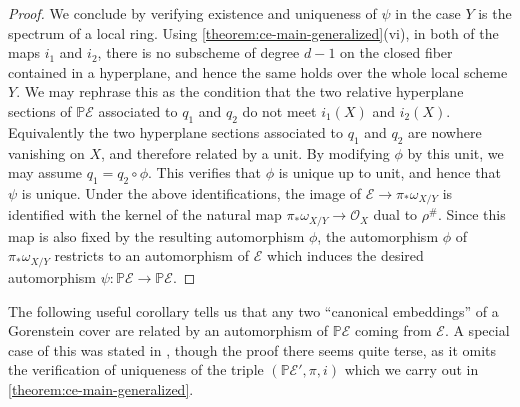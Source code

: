 \documentclass[12 pt]{amsart}
\theoremstyle{plain}
\theoremstyle{definition}
\theoremstyle{remark}
\numberwithin{equation}{section}
\newcommand\bp{\mathbb P}
\newcommand\sce{\mathscr E}
\newcommand\sco{\mathscr O}
\begin{document}
\begin{proof}
	We conclude by verifying existence and uniqueness of $\psi$ in the case $Y$ is the
	spectrum of a local ring.
	Using \autoref{theorem:ce-main-generalized}(vi),
	in both of the maps $i_1$ and $i_2$, 
	there is no subscheme of degree $d - 1$ on the closed fiber contained in
	a hyperplane, and hence the same holds over the whole local scheme $Y$.
	We may rephrase this as the condition that
	the two relative hyperplane sections of $\bp \sce$ associated to $q_1$ and $q_2$ do not meet
	$i_1(X)$ and $i_2(X)$.
	Equivalently the two hyperplane sections associated to $q_1$ and $q_2$ are nowhere vanishing on $X$, and
	therefore related by a unit.
	By modifying $\phi$ by this unit, we may assume $q_1 = q_2 \circ \phi$.
	This verifies that $\phi$ is unique up to unit, and hence that $\psi$ is
	unique.
	Under the above identifications, the image of $\sce \to \pi_*
	\omega_{X/Y}$ is identified with the kernel of the natural map $\pi_*
	\omega_{X/Y} \to \sco_X$ dual to $\rho^\#$.  Since this map is also
	fixed by the resulting automorphism $\phi$, the automorphism $\phi$ of $\pi_*
	\omega_{X/Y}$ restricts to an automorphism of $\sce$ which induces the
	desired automorphism $\psi: \mathbb P \mathscr E \to \mathbb P \mathscr E$. 
\end{proof}

The following useful corollary tells us that any two ``canonical embeddings''
of a Gorenstein cover are related by an automorphism of $\bp \sce$ coming from
$\sce$.
A special case of this was stated in 
\cite[Corollary 2.3]{casnatiN:on-some-gorenstein-loci}, though the proof there
seems quite terse, as it omits the verification of uniqueness of the triple
$(\bp \sce', \pi, i)$ which we carry out in
\autoref{theorem:ce-main-generalized}.
\end{document}
